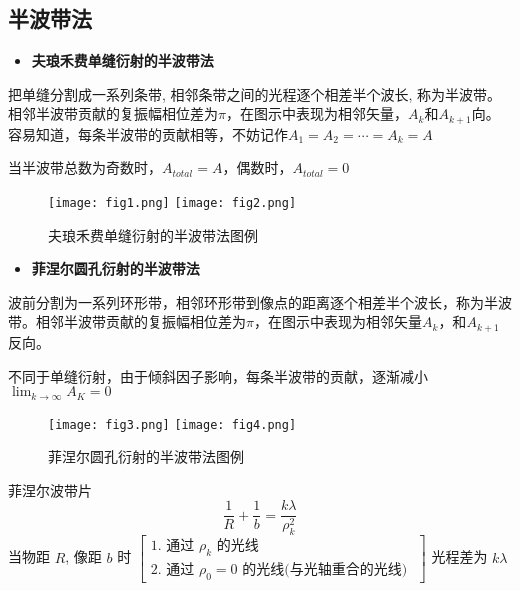 \subsection{半波带法}
\begin{itemize}
	\item \textbf{夫琅禾费单缝衍射的半波带法}
\end{itemize}
\quad \quad 把单缝分割成一系列条带, 相邻条带之间的光程逐个相差半个波长, 称为半波带。
	相邻半波带贡献的复振幅相位差为$\pi$，在图示中表现为相邻矢量，$A_k$和$A_{k+1}$向。
	容易知道，每条半波带的贡献相等，不妨记作$A_1=A_2=\cdots=A_k=A$
	\par 当半波带总数为奇数时，$A_{total}=A$，偶数时，$A_{total}=0$
\begin{figure}[!htp]
	\centering
	\texttt{[image: fig1.png]}
	\hspace{1cm}
	\texttt{[image: fig2.png]}
	\caption{夫琅禾费单缝衍射的半波带法图例}
\end{figure}

\begin{itemize} 
	\item \textbf{菲涅尔圆孔衍射的半波带法}
\end{itemize}

\par 波前分割为一系列环形带，相邻环形带到像点的距离逐个相差半个波长，称为半波带。相邻半波带贡献的复振幅相位差为$\pi$，在图示中表现为相邻矢量$A_k$，和$A_{k+1}$反向。
\par 不同于单缝衍射，由于倾斜因子影响，每条半波带的贡献，逐渐减小$\displaystyle \lim_{k\rightarrow \infty}A_{K}=0$
\begin{figure}[!htp]
	\centering
	\texttt{[image: fig3.png]}
	\hspace{1cm}
	\texttt{[image: fig4.png]}
	\caption{菲涅尔圆孔衍射的半波带法图例}
\end{figure}
\newline


\begin{myprop}{菲涅尔波带片}{}
	\[
	\frac{1}{R}+\frac{1}{b}=\frac{k \lambda}{\rho_k^2}
	\]
	当物距 $R$, 像距 $b$ 时 $\left[\begin{array}{c}1 \text {. 通过 } \rho_k \text { 的光线 } \\ 2 \text {. 通过 } \rho_0=0 \text { 的光线(与光轴重合的光线) }\end{array}\right]$ 光程差为 $k \lambda$
\end{myprop}


